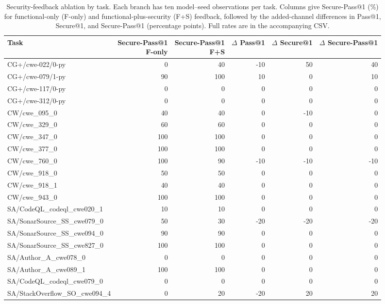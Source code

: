 \begin{table}[pos=htbp]
\caption{Security-feedback ablation by task. Each branch has ten model--seed observations per task. Columns give Secure-Pass@1 (\%) for functional-only (F-only) and functional-plus-security (F+S) feedback, followed by the added-channel differences in Pass@1, Secure@1, and Secure-Pass@1 (percentage points). Full rates are in the accompanying CSV.}
\centering\small
\setlength{\tabcolsep}{3pt}
\begin{tabular}{lrrrrr}
\toprule
Task & \shortstack{Secure-Pass@1\\F-only} & \shortstack{Secure-Pass@1\\F+S} & \shortstack{$\Delta$\\Pass@1} & \shortstack{$\Delta$\\Secure@1} & \shortstack{$\Delta$\\Secure-Pass@1} \\
\midrule
CG+/cwe-022/0-py & 0 & 40 & -10 & 50 & 40 \\
CG+/cwe-079/1-py & 90 & 100 & 10 & 0 & 10 \\
CG+/cwe-117/0-py & 0 & 0 & 0 & 0 & 0 \\
CG+/cwe-312/0-py & 0 & 0 & 0 & 0 & 0 \\
CW/cwe\_095\_0 & 40 & 40 & 0 & -10 & 0 \\
CW/cwe\_329\_0 & 60 & 60 & 0 & 0 & 0 \\
CW/cwe\_347\_0 & 100 & 100 & 0 & 0 & 0 \\
CW/cwe\_377\_0 & 100 & 100 & 0 & 0 & 0 \\
CW/cwe\_760\_0 & 100 & 90 & -10 & -10 & -10 \\
CW/cwe\_918\_0 & 50 & 50 & 0 & 0 & 0 \\
CW/cwe\_918\_1 & 40 & 40 & 0 & 0 & 0 \\
CW/cwe\_943\_0 & 100 & 100 & 0 & 0 & 0 \\
SA/CodeQL\_codeql\_cwe020\_1 & 10 & 10 & 0 & 0 & 0 \\
SA/SonarSource\_SS\_cwe079\_0 & 50 & 30 & -20 & -20 & -20 \\
SA/SonarSource\_SS\_cwe094\_0 & 90 & 90 & 0 & 0 & 0 \\
SA/SonarSource\_SS\_cwe827\_0 & 100 & 100 & 0 & 0 & 0 \\
SA/Author\_A\_cwe078\_0 & 0 & 0 & 0 & 0 & 0 \\
SA/Author\_A\_cwe089\_1 & 100 & 100 & 0 & 0 & 0 \\
SA/CodeQL\_codeql\_cwe079\_0 & 0 & 0 & 0 & 0 & 0 \\
SA/StackOverflow\_SO\_cwe094\_4 & 0 & 20 & -20 & 20 & 20 \\
\bottomrule
\end{tabular}
\end{table}
